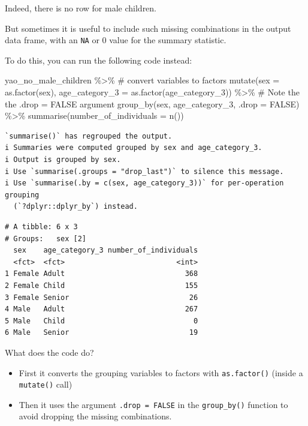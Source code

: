 \documentclass[
  letterpaper,
  DIV=11,
  numbers=noendperiod]{scrreprt}
\newenvironment{Shaded}{\begin{snugshade}}{\end{snugshade}}
\newcommand{\AttributeTok}[1]{\textcolor[rgb]{0.40,0.45,0.13}{#1}}
\newcommand{\CommentTok}[1]{\textcolor[rgb]{0.37,0.37,0.37}{#1}}
\newcommand{\ConstantTok}[1]{\textcolor[rgb]{0.56,0.35,0.01}{#1}}
\newcommand{\FunctionTok}[1]{\textcolor[rgb]{0.28,0.35,0.67}{#1}}
\newcommand{\NormalTok}[1]{\textcolor[rgb]{0.00,0.23,0.31}{#1}}
\newcommand{\SpecialCharTok}[1]{\textcolor[rgb]{0.37,0.37,0.37}{#1}}
\begin{document}
Indeed, there is no row for male children.

But sometimes it is useful to include such missing combinations in the
output data frame, with an \texttt{NA} or 0 value for the summary
statistic.

To do this, you can run the following code instead:

\begin{Shaded}
\begin{Highlighting}[]
\NormalTok{yao\_no\_male\_children }\SpecialCharTok{\%\textgreater{}\%} 
  \CommentTok{\# convert variables to factors}
  \FunctionTok{mutate}\NormalTok{(}\AttributeTok{sex =} \FunctionTok{as.factor}\NormalTok{(sex), }
         \AttributeTok{age\_category\_3 =} \FunctionTok{as.factor}\NormalTok{(age\_category\_3)) }\SpecialCharTok{\%\textgreater{}\%} 
  \CommentTok{\# Note the the .drop = FALSE argument}
  \FunctionTok{group\_by}\NormalTok{(sex, age\_category\_3, }\AttributeTok{.drop =} \ConstantTok{FALSE}\NormalTok{) }\SpecialCharTok{\%\textgreater{}\%} 
  \FunctionTok{summarise}\NormalTok{(}\AttributeTok{number\_of\_individuals =} \FunctionTok{n}\NormalTok{())}
\end{Highlighting}
\end{Shaded}

\begin{verbatim}
`summarise()` has regrouped the output.
i Summaries were computed grouped by sex and age_category_3.
i Output is grouped by sex.
i Use `summarise(.groups = "drop_last")` to silence this message.
i Use `summarise(.by = c(sex, age_category_3))` for per-operation grouping
  (`?dplyr::dplyr_by`) instead.
\end{verbatim}

\begin{verbatim}
# A tibble: 6 x 3
# Groups:   sex [2]
  sex    age_category_3 number_of_individuals
  <fct>  <fct>                          <int>
1 Female Adult                            368
2 Female Child                            155
3 Female Senior                            26
4 Male   Adult                            267
5 Male   Child                              0
6 Male   Senior                            19
\end{verbatim}

What does the code do?

\begin{itemize}
\item
  First it converts the grouping variables to factors with
  \texttt{as.factor()} (inside a \texttt{mutate()} call)
\item
  Then it uses the argument \texttt{.drop\ =\ FALSE} in the
  \texttt{group\_by()} function to avoid dropping the missing
  combinations.
\end{itemize}
\end{document}
